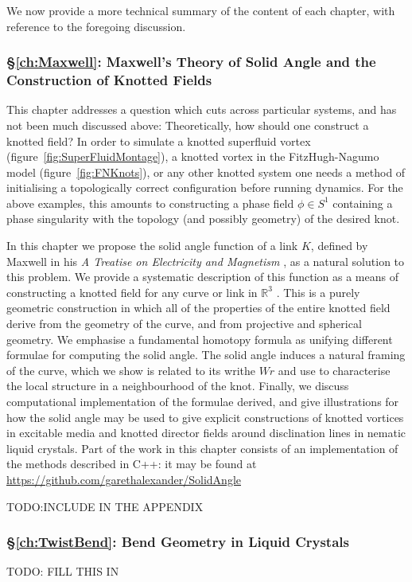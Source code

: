 We now provide a more technical summary of the content of each chapter, with reference to the foregoing discussion.

\subsubsection{\S \ref{ch:Maxwell}: Maxwell's Theory of Solid Angle and the Construction of Knotted Fields}

This chapter addresses a question which cuts across particular systems, and has not been much discussed above: Theoretically, how should one construct a knotted field? In order to simulate a knotted superfluid vortex (figure~\ref{fig:SuperFluidMontage}), a knotted vortex in the FitzHugh-Nagumo model (figure~\ref{fig:FNKnots}), or any other knotted system one needs a method of initialising a topologically correct configuration before running dynamics. For the above examples, this amounts to constructing a phase field $\phi \in S^1$ containing a phase singularity with the topology (and possibly geometry) of the desired knot. 

In this chapter we propose the solid angle function of a link $K$, defined by Maxwell in his \emph{A Treatise on Electricity and Magnetism} \citep{Maxwell2}, as a natural solution to this problem. We provide a systematic description of this function as a means of constructing a knotted field for any curve or link in $\mathbb{R}^3$ . This is a purely geometric construction in which all of the properties of the entire knotted field derive from the geometry of the curve, and from projective and spherical geometry. We emphasise a fundamental homotopy formula as unifying different formulae for computing the solid angle. The solid angle induces a natural framing of the curve, which we show is related to its writhe $Wr$ and use to characterise the local structure in a neighbourhood of the knot. Finally, we discuss computational implementation of the formulae derived, and give illustrations for how the solid angle may be used to give explicit constructions of knotted vortices in excitable media and knotted director fields around disclination lines in nematic liquid crystals. Part of the work in this chapter consists of an implementation of the methods described in C++: it may be found at \href{https://github.com/garethalexander/SolidAngle}{https://github.com/garethalexander/SolidAngle}

TODO:INCLUDE IN THE APPENDIX

\subsubsection{\S \ref{ch:TwistBend}: Bend Geometry in Liquid Crystals}
TODO: FILL THIS IN

